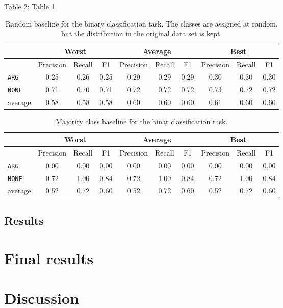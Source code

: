 Table \ref{tbl:bin_maj}; Table \ref{tbl:bin_strat}

 \begin{table}[h]
                \centering
\caption{Random baseline for the binary classification task. The classes are assigned at random, but the distribution in the original data set is kept.}
\label{tbl:bin_strat}
 \begin{tabular}{@{}lccccccccc@{}}
              \toprule
               & \multicolumn{3}{c}{Worst} & \multicolumn{3}{c}{Average} & \multicolumn{3}{c}{Best}  \\ \midrule
               & Precision  & Recall & F1   & Precision  & Recall  & F1    & Precision & Recall & F1   \\ \toprule
\texttt{ARG}	 & 0.25	 & 0.26	 & 0.25	 &0.29	 & 0.29	 & 0.29	 &0.30	 & 0.30	 & 0.30	 \\ 
\texttt{NONE}	 & 0.71	 & 0.70	 & 0.71	 &0.72	 & 0.72	 & 0.72	 &0.73	 & 0.72	 & 0.72	 \\ \midrule 
average	 & 0.58	 & 0.58	 & 0.58	 &0.60	 & 0.60	 & 0.60	 &0.61	 & 0.60	 & 0.60	 \\ \bottomrule

    \end{tabular}
\end{table}

 \begin{table}[h]
                \centering
\caption{Majority class baseline for the binar classification task.}
\label{tbl:bin_maj}
 \begin{tabular}{@{}lccccccccc@{}}
              \toprule
               & \multicolumn{3}{c}{Worst} & \multicolumn{3}{c}{Average} & \multicolumn{3}{c}{Best}  \\ \midrule
               & Precision  & Recall & F1   & Precision  & Recall  & F1    & Precision & Recall & F1   \\ \toprule
\texttt{ARG}	 & 0.00	 & 0.00	 & 0.00	 &0.00	 & 0.00	 & 0.00	 &0.00	 & 0.00	 & 0.00	 \\ 
\texttt{NONE}	 & 0.72	 & 1.00	 & 0.84	 &0.72	 & 1.00	 & 0.84	 &0.72	 & 1.00	 & 0.84	 \\ \midrule 
average	 & 0.52	 & 0.72	 & 0.60	 &0.52	 & 0.72	 & 0.60	 &0.52	 & 0.72	 & 0.60	 \\ \bottomrule

    \end{tabular}
\end{table}

\subsection{Results}

\section{Final results}
\label{sec:final}

\section{Discussion}